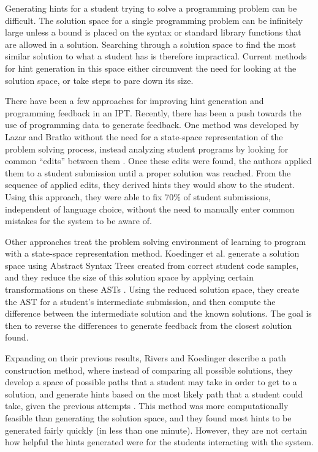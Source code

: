 Generating hints for a student trying to solve a programming problem can be difficult. The solution space for a single programming problem can be infinitely large unless a bound is placed on the syntax or standard library functions that are allowed in a solution. Searching through a solution space to find the most similar solution to what a student has is therefore impractical. Current methods for hint generation in this space either circumvent the need for looking at the solution space, or take steps to pare down its size.

There have been a few approaches for improving hint generation and programming feedback in an IPT. Recently, there has been a push towards the use of programming data to generate feedback. One method was developed by Lazar and Bratko without the need for a state-space representation of the problem solving process, instead analyzing student programs by looking for common “edits” between them \cite{Lazar}. Once these edits were found, the authors applied them to a student submission until a proper solution was reached. From the sequence of applied edits, they derived hints they would show to the student. Using this approach, they were able to fix 70\% of student submissions, independent of language choice, without the need to manually enter common mistakes for the system to be aware of.

Other approaches treat the problem solving environment of learning to program with a state-space representation method. Koedinger et al. generate a solution space using Abstract Syntax Trees created from correct student code samples, and they reduce the size of this solution space by applying certain transformations on these ASTs \cite{Koedinger2013}. Using the reduced solution space, they create the AST for a student's intermediate submission, and then compute the difference between the intermediate solution and the known solutions. The goal is then to reverse the differences to generate feedback from the closest solution found.

Expanding on their previous results, Rivers and Koedinger describe a path construction method, where instead of comparing all possible solutions, they develop a space of possible paths that a student may take in order to get to a solution, and generate hints based on the most likely path that a student could take, given the previous attempts \cite{Rivers2016}. This method was more computationally feasible than generating the solution space, and they found most hints to be generated fairly quickly (in less than one minute). However, they are not certain how helpful the hints generated were for the students interacting with the system.
